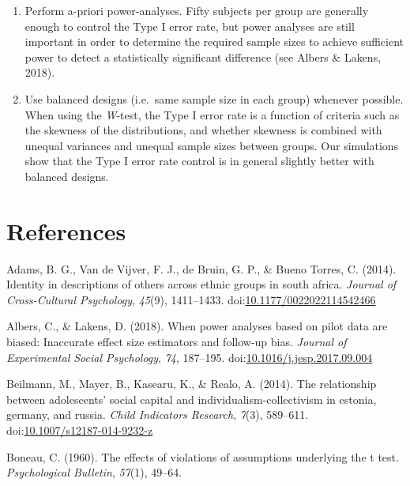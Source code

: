 \documentclass[man,floatsintext]{apa6}
\begin{document}
\begin{enumerate}
\item
  Perform a-priori power-analyses. Fifty subjects per group are generally enough to control the Type I error rate, but power analyses are still important in order to determine the required sample sizes to achieve sufficient power to detect a statistically significant difference (see Albers \& Lakens, 2018).
\item
  Use balanced designs (i.e.~same sample size in each group) whenever possible. When using the \emph{W}-test, the Type I error rate is a function of criteria such as the skewness of the distributions, and whether skewness is combined with unequal variances and unequal sample sizes between groups. Our simulations show that the Type I error rate control is in general slightly better with balanced designs.
\end{enumerate}

\newpage

\hypertarget{references}{%
\section{References}\label{references}}

\setlength{\parindent}{-0.5in}
\setlength{\leftskip}{0.5in}

\hypertarget{refs}{}
\leavevmode\hypertarget{ref-Adams_et_al_2014}{}%
Adams, B. G., Van de Vijver, F. J., de Bruin, G. P., \& Bueno Torres, C. (2014). Identity in descriptions of others across ethnic groups in south africa. \emph{Journal of Cross-Cultural Psychology}, \emph{45}(9), 1411--1433. doi:\href{https://doi.org/10.1177/0022022114542466}{10.1177/0022022114542466}

\leavevmode\hypertarget{ref-Albers_and_Lakens_2018}{}%
Albers, C., \& Lakens, D. (2018). When power analyses based on pilot data are biased: Inaccurate effect size estimators and follow-up bias. \emph{Journal of Experimental Social Psychology}, \emph{74}, 187--195. doi:\href{https://doi.org/10.1016/j.jesp.2017.09.004}{10.1016/j.jesp.2017.09.004}

\leavevmode\hypertarget{ref-Beilmann_et_al_2014}{}%
Beilmann, M., Mayer, B., Kasearu, K., \& Realo, A. (2014). The relationship between adolescents' social capital and individualism-collectivism in estonia, germany, and russia. \emph{Child Indicators Research}, \emph{7}(3), 589--611. doi:\href{https://doi.org/10.1007/s12187-014-9232-z}{10.1007/s12187-014-9232-z}

\leavevmode\hypertarget{ref-Boneau_1960}{}%
Boneau, C. (1960). The effects of violations of assumptions underlying the t test. \emph{Psychological Bulletin}, \emph{57}(1), 49--64.
\end{document}
